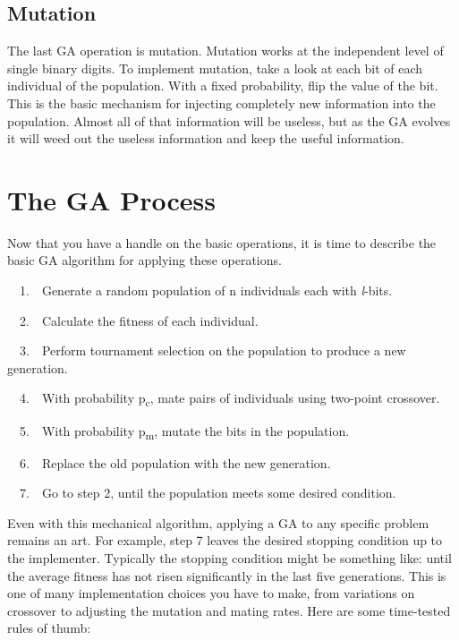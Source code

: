 
\subsection*{Mutation}

The last GA operation is mutation. Mutation works at the independent
level of single binary digits. To implement mutation, take a look at
each bit of each individual of the population. With a fixed
probability, flip the value of the bit. This is the basic mechanism for
injecting completely new information into the population. Almost all of
that information will be useless, but as the GA evolves it will weed
out the useless information and keep the useful information.

\section{The GA Process}

Now that you have a handle on the basic operations, it is time to
describe the basic GA algorithm for applying these operations.

\ \ 1.\ \ Generate a random population of n individuals each with
\textit{l}{}-bits.

\ \ 2.\ \ Calculate the fitness of each individual.

\ \ 3.\ \ Perform tournament selection on the population to produce a
new generation.

\ \ 4.\ \ With probability p\textsubscript{c}, mate pairs of individuals
using two-point crossover.

\ \ 5.\ \ With probability p\textsubscript{m}, mutate the bits in the
population.

\ \ 6.\ \ Replace the old population with the new generation.

\ \ 7.\ \ Go to step 2, until the population meets some desired
condition.

Even with this mechanical algorithm, applying a GA to any specific
problem remains an art. For example, step 7 leaves the desired
stopping condition up to the implementer. Typically the stopping
condition might be something like: until the average fitness has not
risen significantly in the last five generations. This is one of
many implementation choices you have to make,
from variations on crossover to adjusting the
mutation and mating rates. Here are some time-tested rules of thumb:

